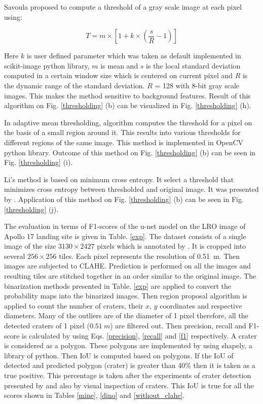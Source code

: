 \documentclass[11pt]{article}
\begin{document}
Savoula proposed to compute a threshold of a gray scale image at each pixel using:

\begin{equation}
T=m \times\left[1+k \times\left(\frac{s}{R}-1\right)\right]
\end{equation}

Here $k$ is user defined parameter which was taken as default implemented in scikit-image python library, $m$ is mean and $s$ is the local standard deviation computed in a certain window size which is centered on current pixel and $R$ is the dynamic range of the standard deviation. $R$ = 128 with 8-bit gray scale images. This makes the method sensitive to background features. Result of this algorithm on Fig. \ref{thresholding} (b) can be visualized in Fig. \ref{thresholding} (h).

In adaptive mean thresholding, algorithm computes the threshold for a pixel on the basis of a small region around it. This results into various thresholds for different regions of the same image. This method is implemented in OpenCV python library. Outcome of this method on Fig. \ref{thresholding} (b) can be seen in Fig. \ref{thresholding} (i).

Li's method is based on minimum cross entropy. It select a threshold that minimizes cross entropy between thresholded and original image. It was presented by \cite{li1993minimum}. Application of this method on Fig. \ref{thresholding} (b) can be seen in Fig. \ref{thresholding} (j).

The evaluation in terms of F1-scores of the u-net model on the LRO image of Apollo 17 landing site is given in Table. \ref{exp}. The dataset consists of a single image of the size $3130 \times 2427$ pixels which is annotated by \cite{dino2020}. It is cropped into several $256 \times 256$ tiles. Each pixel represents the resolution of \SI{0.51}{m}. Then images are subjected to CLAHE. Prediction is performed on all the images and resulting tiles are stitched together in an order similar to the original image. The binarization methods presented in Table. \ref{exp} are applied to convert the probability maps into the binarized images. Then region proposal algorithm is applied to count the number of craters, their $x$, $y$ coordinates and respective diameters. Many of the outliers are of the diameter of 1 pixel therefore, all the detected craters of 1 pixel ($\SI{0.51}{m}$) are filtered out. Then precision, recall and F1-score is calculated by using Eqs. \ref{precision}, \ref{recall} and \ref{f1} respectively. A crater is considered as a polygon. These polygons are implemented by using shapely, a library of python. Then IoU is computed based on polygons. If the IoU of detected and predicted polygon (crater) is greater than 40\% then it is taken as a true positive. This percentage is taken after the experiments of crater detection presented by \cite{emami2015automatic} and also by visual inspection of craters. This IoU is true for all the scores shown in Tables \ref{mine}, \ref{dino} and \ref{without_clahe}.
\end{document}
